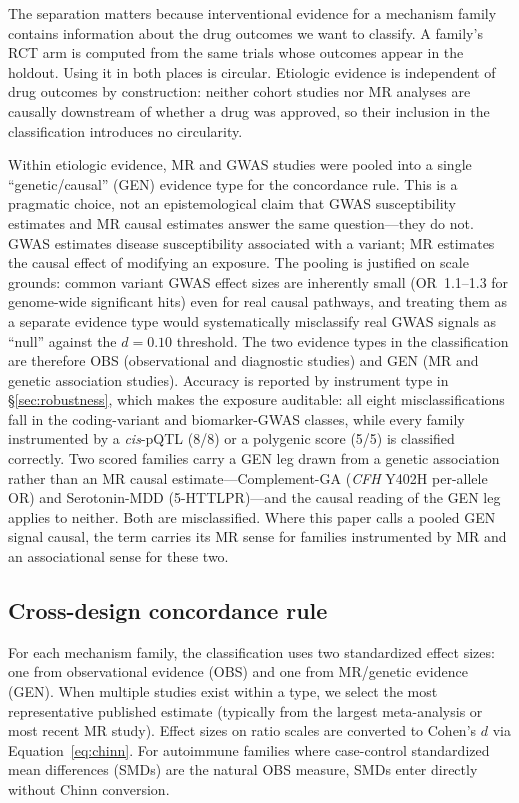 \documentclass[11pt]{article}
\begin{document}
The separation matters because interventional evidence for a mechanism family contains information about the drug outcomes we want to classify. A family's RCT arm is computed from the same trials whose outcomes appear in the holdout. Using it in both places is circular. Etiologic evidence is independent of drug outcomes by construction: neither cohort studies nor MR analyses are causally downstream of whether a drug was approved, so their inclusion in the classification introduces no circularity.

Within etiologic evidence, MR and GWAS studies were pooled into a single ``genetic/causal'' (GEN) evidence type for the concordance rule. This is a pragmatic choice, not an epistemological claim that GWAS susceptibility estimates and MR causal estimates answer the same question---they do not. GWAS estimates disease susceptibility associated with a variant; MR estimates the causal effect of modifying an exposure. The pooling is justified on scale grounds: common variant GWAS effect sizes are inherently small (OR~1.1--1.3 for genome-wide significant hits) even for real causal pathways, and treating them as a separate evidence type would systematically misclassify real GWAS signals as ``null'' against the $d = 0.10$ threshold. The two evidence types in the classification are therefore OBS (observational and diagnostic studies) and GEN (MR and genetic association studies). Accuracy is reported by instrument type in \S\ref{sec:robustness}, which makes the exposure auditable: all eight misclassifications fall in the coding-variant and biomarker-GWAS classes, while every family instrumented by a \emph{cis}-pQTL (8/8) or a polygenic score (5/5) is classified correctly. Two scored families carry a GEN leg drawn from a genetic association rather than an MR causal estimate---Complement-GA (\emph{CFH} Y402H per-allele OR) and Serotonin-MDD (5-HTTLPR)---and the causal reading of the GEN leg applies to neither. Both are misclassified. Where this paper calls a pooled GEN signal causal, the term carries its MR sense for families instrumented by MR and an associational sense for these two.

\subsection{Cross-design concordance rule}
\label{sec:rule}

For each mechanism family, the classification uses two standardized effect sizes: one from observational evidence (OBS) and one from MR/genetic evidence (GEN). When multiple studies exist within a type, we select the most representative published estimate (typically from the largest meta-analysis or most recent MR study). Effect sizes on ratio scales are converted to Cohen's $d$ via Equation~\ref{eq:chinn}. For autoimmune families where case-control standardized mean differences (SMDs) are the natural OBS measure, SMDs enter directly without Chinn conversion.
\end{document}
